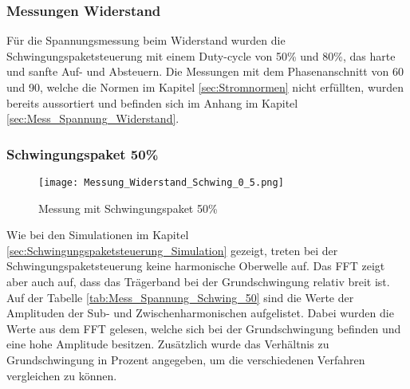 \subsubsection{Messungen Widerstand}
Für die Spannungsmessung beim Widerstand wurden die Schwingungspaketsteuerung mit einem Duty-cycle von 50\% und 80\%, das harte und sanfte Auf- und Absteuern. Die Messungen mit dem Phasenanschnitt von 60\textdegree \hspace{0.02cm} und 90\textdegree, welche die Normen im Kapitel \ref{sec:Stromnormen} nicht erfüllten, wurden bereits aussortiert und befinden sich im Anhang im Kapitel \ref{sec:Mess_Spannung_Widerstand}.


\subsubsection*{Schwingungspaket 50\%}
\begin{figure}[ht!]
	\centering
	\texttt{[image: Messung\_Widerstand\_Schwing\_0\_5.png]}	
	\caption{Messung mit Schwingungspaket 50\%}\label{fig:Mess_Schwing_50}
\end{figure}

Wie bei den Simulationen im Kapitel \ref{sec:Schwingungspaketsteuerung_Simulation} gezeigt, treten bei der Schwingungspaketsteuerung keine harmonische Oberwelle auf. Das FFT zeigt aber auch auf, dass das Trägerband bei der Grundschwingung relativ breit ist. Auf der Tabelle \ref{tab:Mess_Spannung_Schwing_50} sind die Werte der Amplituden der Sub- und Zwischenharmonischen aufgelistet. Dabei wurden die Werte aus dem FFT gelesen, welche sich bei der Grundschwingung befinden und eine hohe Amplitude besitzen. Zusätzlich wurde das Verhältnis zu Grundschwingung in Prozent angegeben, um die verschiedenen Verfahren vergleichen zu können.

